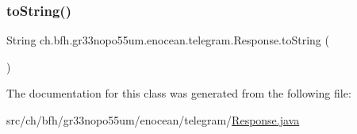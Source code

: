 \subsubsection{\texorpdfstring{to\+String()}{toString()}}
{\footnotesize\ttfamily String ch.\+bfh.\+gr33nopo55um.\+enocean.\+telegram.\+Response.\+to\+String (\begin{DoxyParamCaption}{ }\end{DoxyParamCaption})}



The documentation for this class was generated from the following file\+:\begin{DoxyCompactItemize}
\item 
src/ch/bfh/gr33nopo55um/enocean/telegram/\hyperlink{ch_2bfh_2gr33nopo55um_2enocean_2telegram_2_response_8java}{Response.\+java}\end{DoxyCompactItemize}
